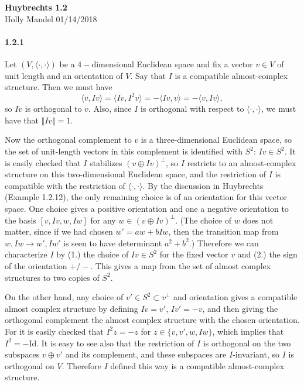 \documentclass[10pt,letter]{article}
\begin{document}
\begin{center} 
{\bf Huybrechts 1.2} \\
Holly Mandel 01/14/2018
\end{center}

\paragraph*{1.2.1} 
Let $(V, \langle \cdot , \cdot \rangle)$ be a $4-$dimensional Euclidean space and fix a vector $v \in V$ of unit length and an orientation of $V$. Say that $I$ is a compatible almost-complex structure. Then we must have \[ \langle v, Iv \rangle = \langle Iv, I^2 v \rangle = - \langle Iv, v \rangle = - \langle v, Iv \rangle, \] so $Iv$ is orthogonal to $v$. Also, since $I$ is orthogonal with respect to $\langle \cdot , \cdot \rangle$, we must have that $\Vert Iv \Vert = 1$. 

Now the orthogonal complement to $v$ is a three-dimensional Euclidean space, so the set of unit-length vectors in this complement is identified with $S^2$: $Iv \in S^2$. It is easily checked that $I$ stabilizes $(v \oplus Iv)^{\perp}$, so $I$ restricts to an almost-complex structure on this two-dimensional Euclidean space, and the restriction of $I$ is compatible with the restriction of $\langle \cdot , \cdot \rangle$. By the discussion in Huybrechts (Example 1.2.12), the only remaining choice is of an orientation for this vector space. One choice gives a positive orientation and one a negative orientation to the basis $[v,Iv,w,Iw]$ for any $w \in (v \oplus Iv)^{\perp}$. (The choice of $w$ does not matter, since if we had chosen $w' = aw + b Iw$, then the transition map from $w, Iw \rightarrow w', Iw'$ is seen to have determinant $a^2 + b^2$.) Therefore we can characterize $I$ by (1.) the choice of $Iv \in S^2$ for the fixed vector $v$ and (2.) the sign of the orientation $+/-$. This gives a map from the set of almost complex structures to two copies of $S^2$. 

On the other hand, any choice of $v' \in S^2 \subset v^{\perp}$ and orientation gives a compatible almost complex structure by defining $Iv = v'$, $Iv' = -v$, and then giving the orthogonal complement the almost complex structure with the chosen orientation. For it is easily checked that $I^2z = -z$ for $z \in \lbrace v, v', w, Iw \rbrace$, which implies that $I^2 = -\text{Id}$. It is easy to see also that the restriction of $I$ is orthogonal on the two subspaces $v \oplus v'$ and its complement, and these subspaces are $I$-invariant, so $I$ is orthogonal on $V$. Therefore $I$ defined this way is a compatible almost-complex structure.  
\end{document}
